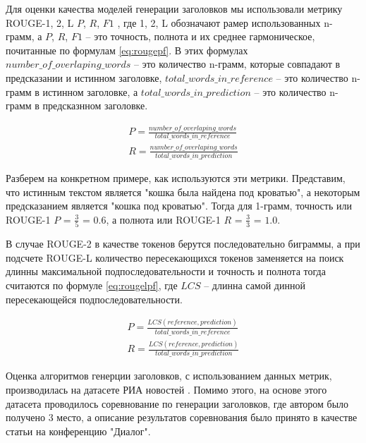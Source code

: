 \documentclass[14pt]{matmex-diploma-custom}
\begin{document}
Для оценки качества моделей генерации заголовков мы использовали метрику ROUGE-1, 2, L $P$, $R$, $F1$ \cite{Lin:2004}, где 1, 2, L обозначают рамер использованных
n-грамм, а $P$, $R$, $F1$ -- это точность, полнота и их среднее гармоническое, почитанные по формулам \ref{eq:rougepf}. В этих формулах $number\_of\_overlaping\_words$ -- это количество n-грамм, которые совпадают в предсказании и истинном заголовке, $total\_words\_in\_reference$ -- это количество n-грамм в истинном заголовке, а $total\_words\_in\_prediction$ -- это количество n-грамм в предсказнном заголовке.

\begin{equation}\label{eq:rougepf}
\begin{gathered}
P = \frac{number\_of\_overlaping\_words}{total\_words\_in\_reference} \\ 
R = \frac{number\_of\_overlaping\_words}{total\_words\_in\_prediction}
\end{gathered}
\end{equation}

Разберем на конкретном примере, как используются эти метрики. Представим, что истинным текстом является "кошка была найдена под кроватью", а некоторым предсказанием является "кошка под кроватью".
Тогда для 1-грамм, точность или ROUGE-1 $P$ = $\frac{3}{5}$ = $0.6$, а полнота или ROUGE-1 $R$ = $\frac{3}{3}$ = $1.0$.

В случае ROUGE-2 в качестве токенов берутся последовательно биграммы, а при подсчете ROUGE-L количество пересекающихся токенов заменяется на поиск длинны максимальной подпоследовательности и точность и полнота тогда считаются по формуле \ref{eq:rougelpf}, где $LCS$ -- длинна самой динной пересекающейся подпоследовательности.

\begin{equation}\label{eq:rougelpf}
\begin{gathered}
P = \frac{LCS(reference, prediction)}{total\_words\_in\_reference} \\ 
R = \frac{LCS(reference, prediction)}{total\_words\_in\_prediction}
\end{gathered}
\end{equation}

Оценка алгоритмов генерции заголовков, с использованием данных метрик, производилась на датасете 
РИА новостей \cite{gavrilov2018self}. Помимо этого,
на основе этого датасета проводилось соревнование по генерации заголовков, где автором было
получено 3 место, а описание результатов соревнования было принято в качестве статьи на конференцию "Диалог".
\end{document}
